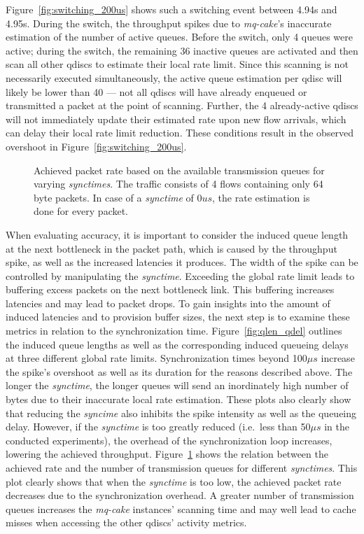 Figure~\ref{fig:switching_200us} shows such a switching event between 4.94s and 4.95s.
%
During the switch, the throughput spikes due to \textit{mq-cake}'s inaccurate estimation of the number of active queues.
%
Before the switch, only 4 queues were active; during the switch, the remaining 36 inactive queues are activated and then scan all other qdiscs to estimate their local rate limit.
%
Since this scanning is not necessarily executed simultaneously, the active queue estimation per qdisc will likely be lower than 40 --- not all qdiscs will have already enqueued or transmitted a packet at the point of scanning.
%
Further, the 4 already-active qdiscs will not immediately update their estimated rate upon new flow arrivals, which can delay their local rate limit reduction.
%
These conditions result in the observed overshoot in Figure~\ref{fig:switching_200us}.
%

\begin{figure}[h]
    \centering
    
    \caption{Achieved packet rate based on the available transmission queues for varying \textit{synctimes}. The traffic consists of 4 flows containing only 64 byte packets. In case of a \textit{synctime} of $0us$, the rate estimation is done for every packet.}\label{fig:sync_txq_64}
\end{figure}
%
When evaluating accuracy, it is important to consider the induced queue length at the next bottleneck in the packet path, which is caused by the throughput spike, as well as the increased latencies it produces.
%
The width of the spike can be controlled by manipulating the \textit{synctime}.
%
Exceeding the global rate limit leads to buffering excess packets on the next bottleneck link.
%
This buffering increases latencies and may lead to packet drops.
%
To gain insights into the amount of induced latencies and to provision buffer sizes, the next step is to examine these metrics in relation to the synchronization time. 
%
Figure~\ref{fig:qlen_qdel} outlines the induced queue lengths as well as the corresponding induced queueing delays at three different global rate limits.
%
Synchronization times beyond 100$\mu s$ increase the spike's overshoot as well as its duration for the reasons described above.
%
The longer the \textit{synctime}, the longer queues will send an inordinately high number of bytes due to their inaccurate local rate estimation.
%
These plots also clearly show that reducing the \textit{syncime} also inhibits the spike intensity as well as the queueing delay.
%
However, if the \textit{synctime} is too greatly reduced (i.e.\ less than 50$\mu s$ in the conducted experiments), the overhead of the synchronization loop increases, lowering the achieved throughput.
%
Figure~\ref{fig:sync_txq_64} shows the relation between the achieved rate and the number of transmission queues for different \textit{synctimes}.
%
This plot clearly shows that when the \textit{synctime} is too low, the achieved packet rate decreases due to the synchronization overhead.
%
A greater number of transmission queues increases the \textit{mq-cake} instances' scanning time and may well lead to cache misses when accessing the other qdiscs' activity metrics.
%

